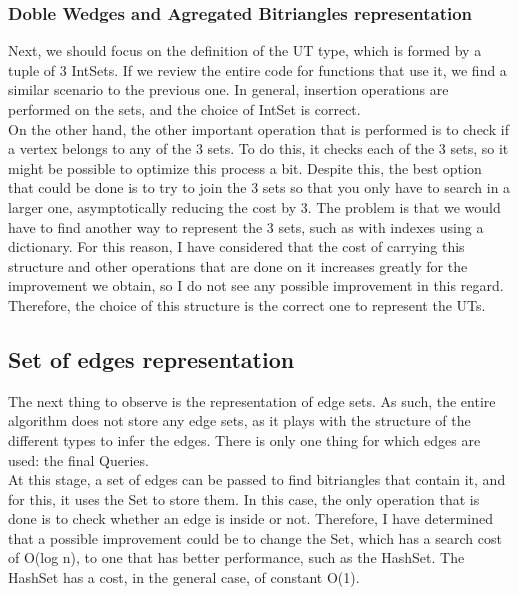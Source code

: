 \subsubsection*{Doble Wedges and Agregated Bitriangles representation}
Next, we should focus on the definition of the UT type, which is formed by a tuple of 3 IntSets.
If we review the entire code for functions that use it, we find a similar scenario to the previous one.
In general, insertion operations are performed on the sets, and the choice of IntSet is correct. \\

On the other hand, the other important operation that is performed is to check if a vertex belongs to any of the 3 sets.
To do this, it checks each of the 3 sets, so it might be possible to optimize this process a bit.
Despite this, the best option that could be done is to try to join the 3 sets so that you only have to search in a larger one, asymptotically reducing the cost by 3.
The problem is that we would have to find another way to represent the 3 sets, such as with indexes using a dictionary.
For this reason, I have considered that the cost of carrying this structure and other operations that are done on it increases greatly for the improvement we obtain, so I do not see any possible improvement in this regard. \\

Therefore, the choice of this structure is the correct one to represent the UTs.

\subsection{Set of edges representation}
The next thing to observe is the representation of edge sets.
As such, the entire algorithm does not store any edge sets, as it plays with the structure of the different types to infer the edges.
There is only one thing for which edges are used: the final Queries. \\

At this stage, a set of edges can be passed to find bitriangles that contain it, and for this, it uses the Set to store them.
In this case, the only operation that is done is to check whether an edge is inside or not.
Therefore, I have determined that a possible improvement could be to change the Set, which has a search cost of O(log n), to one that has better performance, such as the HashSet.
The HashSet has a cost, in the general case, of constant O(1). \\

